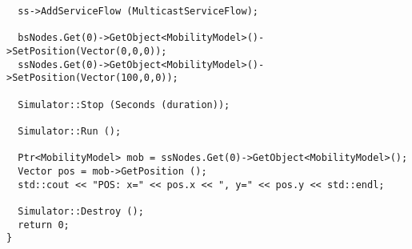 \documentclass[14pt,a4paper]{article}
\begin{document}
{\begin{verbatim}
  ss->AddServiceFlow (MulticastServiceFlow);

  bsNodes.Get(0)->GetObject<MobilityModel>()->SetPosition(Vector(0,0,0));
  ssNodes.Get(0)->GetObject<MobilityModel>()->SetPosition(Vector(100,0,0));
  
  Simulator::Stop (Seconds (duration));

  Simulator::Run ();

  Ptr<MobilityModel> mob = ssNodes.Get(0)->GetObject<MobilityModel>();
  Vector pos = mob->GetPosition ();
  std::cout << "POS: x=" << pos.x << ", y=" << pos.y << std::endl;

  Simulator::Destroy ();
  return 0;
}

 \end{verbatim}}
\end{document}
